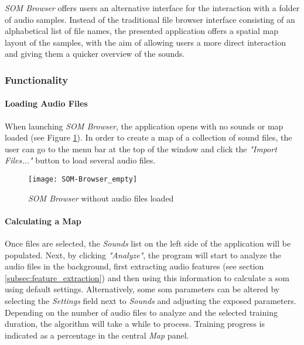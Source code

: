 \textit{SOM Browser} offers users an alternative interface for the interaction
with a folder of audio samples. Instead of the traditional file browser
interface consisting of an alphabetical list of file names, the presented
application offers a spatial map layout of the samples, with the aim of allowing
users a more direct interaction and giving them a quicker overview of the
sounds.

\subsubsection{Functionality}
\label{subsubsec:som-browser_functionality}
\paragraph{Loading Audio Files}
When launching \textit{SOM Browser}, the application opens with no sounds or map
loaded (see Figure \ref{fig:som-browser_empty}). In order to create a map of
a collection of sound files, the user can go to the menu bar at the top of the
window and click the \textit{"Import Files..."} button to load several audio
files.

\begin{figure}[!htb]
  \centering
  \texttt{[image: SOM-Browser\_empty]}
  \caption{\textit{SOM Browser} without audio files loaded}
  \label{fig:som-browser_empty}
\end{figure}

\paragraph{Calculating a Map}
Once files are selected, the \textit{Sounds} list on the left side of the
application will be populated. Next, by clicking \textit{"Analyze"}, the program
will start to analyze the audio files in the background, first extracting
audio features (see section \ref{subsec:feature_extraction}) and then using this
information to calculate a \gls{som} using default settings. Alternatively,
some \gls{som} parameters can be altered by selecting the \textit{Settings}
field next to \textit{Sounds} and adjusting the exposed parameters. Depending on
the number of audio files to analyze and the selected training duration, the
algorithm will take a while to process. Training progress is indicated as a
percentage in the central \textit{Map} panel.

\smallskip

